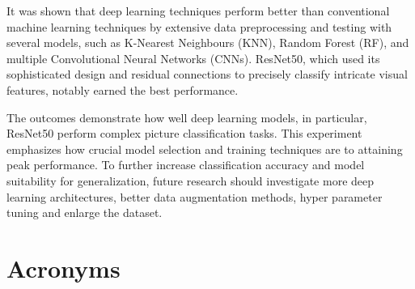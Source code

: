 \documentclass[conference]{IEEEtran}
\begin{document}
It was shown that deep learning techniques perform better than conventional machine learning techniques by extensive data preprocessing and testing with several models, such as K-Nearest Neighbours (\ac{KNN}), Random Forest (\ac{RF}), and multiple Convolutional Neural Networks (CNNs). ResNet50, which used its sophisticated design and residual connections to precisely classify intricate visual features, notably earned the best performance.

The outcomes demonstrate how well deep learning models, in particular, ResNet50 perform complex picture classification tasks. This experiment emphasizes how crucial model selection and training techniques are to attaining peak performance. To further increase classification accuracy and model suitability for generalization, future research should investigate more deep learning architectures, better data augmentation methods, hyper parameter tuning and enlarge the dataset.





\section{Acronyms}
\begin{acronym}
\end{acronym}
\end{document}
